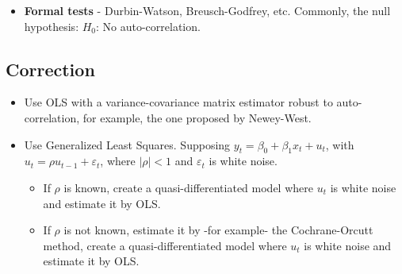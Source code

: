 \documentclass[10pt, a4paper, landscape]{extarticle}
\begin{document}
\begin{multicols}{3}
\begin{itemize}[leftmargin=*]
\begin{multicols}{3}
			\end{multicols}
			\item \textbf{Formal tests} - Durbin-Watson, Breusch-Godfrey, etc. Commonly, the null hypothesis: $H_0$: No auto-correlation.
		\end{itemize}
	\subsection*{Correction}
		\begin{itemize}[leftmargin=*]
			\item Use OLS with a variance-covariance matrix estimator robust to auto-correlation, for example, the one proposed by Newey-West.
			\item Use Generalized Least Squares. Supposing $y_t = \beta_0 + \beta_1 x_t + u_t$, with $u_t = \rho u_{t-1} + \varepsilon_t$, where $|\rho| < 1$ and $\varepsilon_t$ is white noise.
			\begin{itemize}[leftmargin=*]
				\item If $\rho$ is known, create a quasi-differentiated model where $u_t$ is white noise and estimate it by OLS.
				\item If $\rho$ is not known, estimate it by -for example- the Cochrane-Orcutt method, create a quasi-differentiated model where $u_t$ is white noise and estimate it by OLS.
			\end{itemize}
		\end{itemize}
\end{multicols}
\end{document}
